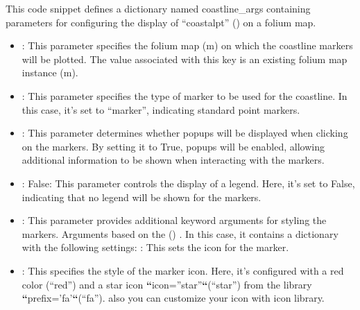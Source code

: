 \documentclass[letterpaper,10pt,english]{sphinxmanual}
\begin{document}
\sphinxAtStartPar
This code snippet defines a dictionary named coastline\_args containing parameters for configuring the display of “coastalpt”  () on a folium map.
\begin{itemize}
\item {} 
\sphinxAtStartPar
{}: This parameter specifies the folium map (m) on which the coastline markers will be plotted. The value associated with this key is an existing folium map instance (m).

\item {} 
\sphinxAtStartPar
{}: This parameter specifies the type of marker to be used for the coastline. In this case, it’s set to “marker”, indicating standard point markers.

\item {} 
\sphinxAtStartPar
{}: This parameter determines whether popups will be displayed when clicking on the markers. By setting it to True, popups will be enabled, allowing additional information to be shown when interacting with the markers.

\item {} 
\sphinxAtStartPar
{}: False: This parameter controls the display of a legend. Here, it’s set to False, indicating that no legend will be shown for the markers.

\item {} 
\sphinxAtStartPar
{}: This parameter provides additional keyword arguments for styling the markers. Arguments based on the  () . In this case, it contains a dictionary with the following settings: : This sets the icon for the marker.

\item {} 
\sphinxAtStartPar
{}: This specifies the style of the marker icon. Here, it’s configured with a red color  (“red”) and a star icon {\color{red}\bfseries{}``}icon=”star”{\color{red}\bfseries{}``}(“star”) from the  library {\color{red}\bfseries{}``}prefix=’fa’{\color{red}\bfseries{}``}(“fa”). also you can customize your icon with  icon library.

\end{itemize}
\end{document}
